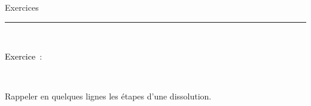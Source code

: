 \documentclass[11pt,a4paper]{article}
\newcounter{numexos}%
\newcommand{\exercice}[1]{%
\addtocounter{numexos}{1}%
\textcolor{black}{\normalsize Exercice\,\thenumexos\,}\,#1%
}
\newcommand{\bex}[2]
{
{\exercice:~~{#1}}
~~
{#2}
~~
}
\begin{document}


\begin{center}
 \LARGE{Exercices } \\[3mm]
\end{center}



\normalsize

\hrule\
\\[0,5cm]



  \raggedright
  
\bex{}{Rappeler en quelques lignes les étapes d'une dissolution.

\vspace{5mm}
\dotfill 

\vspace{5mm}
\dotfill 

\vspace{5mm}
\dotfill 

\vspace{5mm}
\dotfill 
\vspace{3mm}

}


\vspace{0.2cm}
\end{document}

